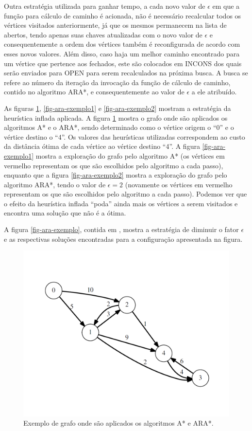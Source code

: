 Outra estratégia utilizada para ganhar tempo, a cada novo valor de $\epsilon$ em que a função para cálculo de caminho é acionada, não é necessário recalcular todos os vértices visitados anteriormente, já que os mesmos permanecem na lista de abertos, tendo apenas suas chaves atualizadas com o novo valor de $\epsilon$ e consequentemente a ordem dos vértices também é reconfigurada de acordo com esses novos valores. Além disso, caso haja um melhor caminho encontrado para um vértice que pertence aos fechados, este são colocados em INCONS dos quais serão enviados para OPEN para serem recalculados na próxima busca. A busca se refere ao número da iteração da invocação da função de cálculo de caminho, contido no algoritmo ARA*, e consequentemente ao valor de $\epsilon$ a ele atribuído.

As figuras \ref{fig-ara-exemplo3}, \ref{fig-ara-exemplo1} e \ref{fig-ara-exemplo2} mostram a estratégia da heurística inflada aplicada. A figura \ref{fig-ara-exemplo3} mostra o grafo onde são aplicados os algoritmos A* e o ARA*, sendo determinado como o vértice origem o ``0'' e o vértice destino o ``4''. Os valores das heurísticas utilizadas correspondem ao custo da distância ótima de cada vértice ao vértice destino ``4''. A figura \ref{fig-ara-exemplo1} mostra a exploração do grafo pelo algoritmo A* (os vértices em vermelho representam os que são escolhidos pelo algoritmo a cada passo), enquanto que a figura \ref{fig-ara-exemplo2} mostra a exploração do grafo pelo algoritmo ARA*, tendo o valor de $\epsilon = 2$ (novamente os vértices em vermelho representam os que são escolhidos pelo algoritmo a cada passo). Podemos ver que o efeito da heurística inflada ``poda'' ainda mais os vértices a serem visitados e encontra uma solução que não é a ótima.

A figura \ref{fig-ara-exemplo}, contida em , mostra a estratégia de diminuir o fator $\epsilon$ e as respectivas soluções encontradas para a configuração apresentada na figura.
\newpage
\begin{figure}[H]
\centering
\includegraphics[width=.70\textwidth]{figuras/ARA-exemplo3} 
\caption{Exemplo de grafo onde são aplicados os algoritmos A* e ARA*.}
\label{fig-ara-exemplo3}
\end{figure}

